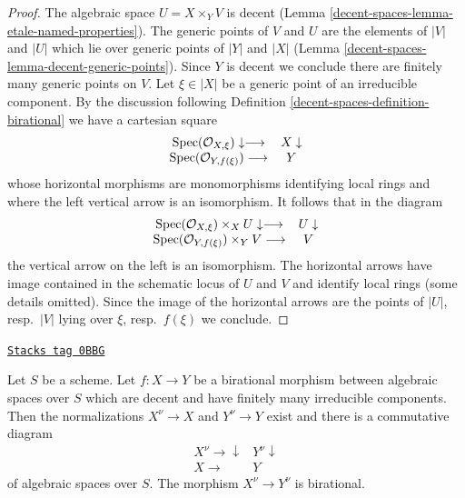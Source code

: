 \begin{proof}
The algebraic space $U = X \times_Y V$ is decent
(Lemma \ref{decent-spaces-lemma-etale-named-properties}).
The generic points of $V$ and $U$ are the elements of $|V|$ and $|U|$
which lie over generic points of $|Y|$ and $|X|$
(Lemma \ref{decent-spaces-lemma-decent-generic-points}).
Since $Y$ is decent we conclude there are finitely many generic points
on $V$. Let $\xi \in |X|$ be a generic point of an irreducible component.
By the discussion following Definition \ref{decent-spaces-definition-birational}
we have a cartesian square
$$
\begin{array}{cc}\operatorname{Spec}(\mathcal{O}_{X, \xi}) \downarrow\longrightarrow & X \downarrow \\ \operatorname{Spec}(\mathcal{O}_{Y, f(\xi)}) \longrightarrow & Y\end{array}
$$
whose horizontal morphisms are monomorphisms identifying local rings
and where the left vertical arrow is an isomorphism. It follows that
in the diagram
$$
\begin{array}{cc}\operatorname{Spec}(\mathcal{O}_{X, \xi}) \times_X U \downarrow\longrightarrow & U \downarrow \\ \operatorname{Spec}(\mathcal{O}_{Y, f(\xi)}) \times_Y V \longrightarrow & V\end{array}
$$
the vertical arrow on the left is an isomorphism. The horizontal arrows
have image contained in the schematic locus of $U$ and $V$ and
identify local rings (some details omitted). Since the image of
the horizontal arrows are the points of $|U|$, resp.\ $|V|$
lying over $\xi$, resp.\ $f(\xi)$ we conclude.
\end{proof}

\begin{lemma}
\label{decent-spaces-lemma-birational-induced-morphism-normalizations}
\href{https://stacks.math.columbia.edu/tag/0BBG}{\texttt{Stacks tag 0BBG}}

Let $S$ be a scheme. Let $f : X \to Y$ be a birational morphism between
algebraic spaces over $S$ which are decent and have finitely many irreducible
components. Then the normalizations $X^\nu \to X$ and $Y^\nu \to Y$ exist
and there is a commutative diagram
$$
\begin{array}{cc}X^\nu \longrightarrow\downarrow & Y^\nu \downarrow \\ X \longrightarrow & Y\end{array}
$$
of algebraic spaces over $S$. The morphism $X^\nu \to Y^\nu$ is birational.
\end{lemma}

